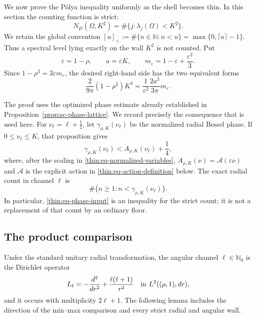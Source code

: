 \documentclass[11pt]{article}
\numberwithin{equation}{section}
\theoremstyle{definition}
\theoremstyle{remark}
\begin{document}
We now prove the P\'olya inequality uniformly as the shell becomes thin.  In
this section the counting function is strict:
\[
  N_D(\Omega,K^2)=\#\{j:\lambda_j(\Omega)<K^2\}.
\]
We retain the global convention
\([u]_<:=\#\{n\in\mathbb N:n<u\}=\max\{0,\lceil u\rceil-1\}\).
Thus a spectral level lying exactly on the wall \(K^2\) is not counted.  Put
\begin{equation}
  \varepsilon=1-\rho,
  \qquad a=\varepsilon K,
  \qquad
  m_\varepsilon=1-\varepsilon+\frac{\varepsilon^2}{3}.
  \label{thin:eq-normalized-variables}
\end{equation}
Since \(1-\rho^3=3\varepsilon m_\varepsilon\), the desired right-hand side
has the two equivalent forms
\begin{equation}
  \frac{2}{9\pi}(1-\rho^3)K^3
  =\frac{1}{\varepsilon^2}\frac{2a^3}{3\pi}m_\varepsilon.
  \label{thin:eq-weyl-normalization}
\end{equation}

The proof uses the optimized phase estimate already established in
Proposition~\ref{prop:sc-phase-lattice}.  We record precisely the consequence
that is used here.  For
\(\nu_\ell=\ell+\tfrac12\), let
\(\gamma_{\rho,K}(\nu_\ell)\) be the normalized radial Bessel phase.  If
\(0\leq\nu_\ell\leq K\), that proposition gives
\begin{equation}
  \gamma_{\rho,K}(\nu_\ell)
  < A_{\rho,K}(\nu_\ell)+\frac14,
  \label{thin:eq-phase-input}
\end{equation}
where, after the scaling in \eqref{thin:eq-normalized-variables},
\(A_{\rho,K}(\nu)=\mathcal A(\varepsilon\nu)\) and
\(\mathcal A\) is the explicit action in
\eqref{thin:eq-action-definition} below.  The exact radial count in channel
\(\ell\) is
\begin{equation}
  \#\{n\geq1:n<\gamma_{\rho,K}(\nu_\ell)\}.
  \label{thin:eq-exact-phase-count}
\end{equation}
In particular, \eqref{thin:eq-phase-input} is an inequality for the strict
count; it is not a replacement of that count by an ordinary floor.

\subsection{The product comparison}

Under the standard unitary radial transformation, the angular channel
\(\ell\in\mathbb N_0\) is the Dirichlet operator
\[
  L_\ell=-\frac{d^2}{dr^2}+\frac{\ell(\ell+1)}{r^2}
  \quad\hbox{in }L^2((\rho,1),dr),
\]
and it occurs with multiplicity \(2\ell+1\).  The following lemma includes
the direction of the min--max comparison and every strict radial and angular
wall.
\end{document}
